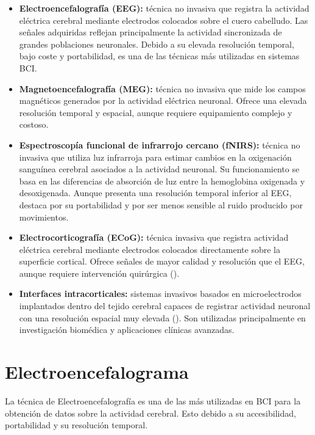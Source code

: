\begin{itemize}
  \item \textbf{Electroencefalografía (EEG):} técnica no invasiva que registra la actividad eléctrica cerebral mediante electrodos colocados sobre el cuero cabelludo. Las señales adquiridas reflejan principalmente la actividad sincronizada de grandes poblaciones neuronales. Debido a su elevada resolución temporal, bajo coste y portabilidad, es una de las técnicas más utilizadas en sistemas BCI.

  \item \textbf{Magnetoencefalografía (MEG):} técnica no invasiva que mide los campos magnéticos generados por la actividad eléctrica neuronal. Ofrece una elevada resolución temporal y espacial, aunque requiere equipamiento complejo y costoso.

  \item \textbf{Espectroscopía funcional de infrarrojo cercano (fNIRS):} técnica no invasiva que utiliza luz infrarroja para estimar cambios en la oxigenación sanguínea cerebral asociados a la actividad neuronal. Su funcionamiento se basa en las diferencias de absorción de luz entre la hemoglobina oxigenada y desoxigenada. Aunque presenta una resolución temporal inferior al EEG, destaca por su portabilidad y por ser menos sensible al ruido producido por movimientos.

  \item \textbf{Electrocorticografía (ECoG):} técnica invasiva que registra actividad eléctrica cerebral mediante electrodos colocados directamente sobre la superficie cortical. Ofrece señales de mayor calidad y resolución que el EEG, aunque requiere intervención quirúrgica (\cite{leuthardt2004brain}).

  \item \textbf{Interfaces intracorticales:} sistemas invasivos basados en microelectrodos implantados dentro del tejido cerebral capaces de registrar actividad neuronal con una resolución espacial muy elevada (\cite{hochberg2006neuronal}). Son utilizadas principalmente en investigación biomédica y aplicaciones clínicas avanzadas.
\end{itemize}

\section{Electroencefalograma}
\label{sec:eeg}

La técnica de Electroencefalografía es una de las más utilizadas en BCI para la obtención de datos sobre la actividad cerebral. Esto debido a su accesibilidad, portabilidad y su resolución temporal. 

